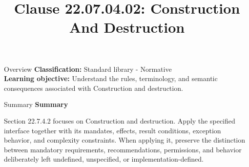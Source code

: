 \documentclass[10pt,letterpaper]{article}
\title{Clause 22.07.04.02: Construction And Destruction}
\author{}
\date{}
\begin{document}
\maketitle
\begin{CornellOverviewBox}{Overview}
\textbf{Classification:} Standard library - Normative\\[2pt]
\textbf{Learning objective:} Understand the rules, terminology, and semantic consequences associated with Construction and destruction.
\end{CornellOverviewBox}\begin{CornellSummaryBox}{Summary}
{\sffamily\bfseries\color{Accent} Summary}\par\vspace{3pt}Section 22.7.4.2 focuses on Construction and destruction. Apply the specified interface together with its mandates, effects, result conditions, exception behavior, and complexity constraints. When applying it, preserve the distinction between mandatory requirements, recommendations, permissions, and behavior deliberately left undefined, unspecified, or implementation-defined.
\end{CornellSummaryBox}
\end{document}
